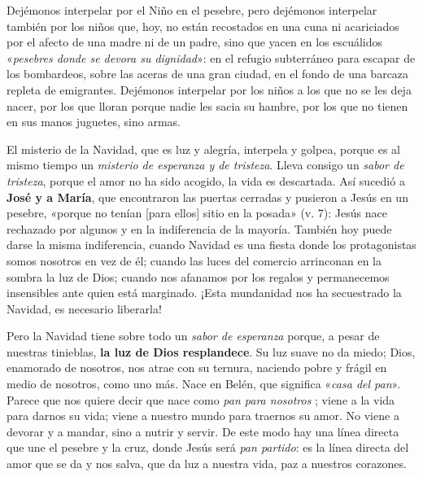 \documentclass[]{article}
\begin{document}
Dejémonos interpelar por el Niño en el pesebre, pero dejémonos
interpelar también por los niños que, hoy, no están recostados en una
cuna ni acariciados por el afecto de una madre ni de un padre, sino que
yacen en los escuálidos «\emph{pesebres donde se devora su dignidad}»:
en el refugio subterráneo para escapar de los bombardeos, sobre las
aceras de una gran ciudad, en el fondo de una barcaza repleta de
emigrantes. Dejémonos interpelar por los niños a los que no se les deja
nacer, por los que lloran porque nadie les sacia su hambre, por los que
no tienen en sus manos juguetes, sino armas.

El misterio de la Navidad, que es luz y alegría, interpela y golpea,
porque es al mismo tiempo un \emph{misterio de esperanza y de tristeza}.
Lleva consigo un \emph{sabor de tristeza}, porque el amor no ha sido
acogido, la vida es descartada. Así sucedió a \textbf{José y a María},
que encontraron las puertas cerradas y pusieron a Jesús en un pesebre,
«porque no tenían {[}para ellos{]} sitio en la posada» (v. 7): Jesús
nace rechazado por algunos y en la indiferencia de la mayoría. También
hoy puede darse la misma indiferencia, cuando Navidad es una fiesta
donde los protagonistas somos nosotros en vez de él; cuando las luces
del comercio arrinconan en la sombra la luz de Dios; cuando nos afanamos
por los regalos y permanecemos insensibles ante quien está marginado.
¡Esta mundanidad nos ha secuestrado la Navidad, es necesario liberarla!

Pero la Navidad tiene sobre todo un \emph{sabor de esperanza} porque, a
pesar de nuestras tinieblas, \textbf{la luz de Dios resplandece}. Su luz
suave no da miedo; Dios, enamorado de nosotros, nos atrae con su
ternura, naciendo pobre y frágil en medio de nosotros, como uno más.
Nace en Belén, que significa «\emph{casa del pan}». Parece que nos
quiere decir que nace como \emph{pan para nosotros} ; viene a la vida
para darnos su vida; viene a nuestro mundo para traernos su amor. No
viene a devorar y a mandar, sino a nutrir y servir. De este modo hay una
línea directa que une el pesebre y la cruz, donde Jesús será \emph{pan
partido}: es la línea directa del amor que se da y nos salva, que da luz
a nuestra vida, paz a nuestros corazones.
\end{document}
